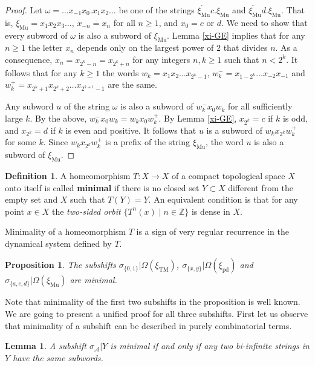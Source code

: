 \documentclass[12pt]{article}
\newtheorem{lemma}[theorem]{Lemma}
\newtheorem{proposition}[theorem]{Proposition}
\theoremstyle{definition}
\newtheorem{definition}[theorem]{Definition}
\def\bZ{\mathbb{Z}}
\def\cA{\mathcal{A}}
\def\om{\omega}
\def\si{\sigma}
\def\Om{\Omega}
\def\xiTM{\xi_{\mathrm{TM}}}
\def\xipd{\xi_{\mathrm{pd}}}
\def\xiGE{\xi_{\mathrm{Mu}}}
\begin{document}
\begin{proof}
Let $\om=\ldots x_{-1}x_0.x_1x_2\ldots$ be one of the strings 
$\overleftarrow{\xiGE}c.\xiGE$ and $\overleftarrow{\xiGE}d.\xiGE$.  That 
is, $\xiGE=x_1x_2x_3\ldots$, $x_{-n}=x_n$ for all $n\ge1$, and $x_0=c$ or 
$d$.  We need to show that every subword of $\om$ is also a subword of 
$\xiGE$.  Lemma \ref{xi-GE} implies that for any $n\ge1$ the letter 
$x_n$ depends only on the largest power of $2$ that divides $n$.  As a 
consequence, $x_n=x_{2^k-n}=x_{2^k+n}$ for any integers $n,k\ge1$ such that 
$n<2^k$.  It follows that for any $k\ge1$ the words $w_k=x_1x_2\ldots 
x_{2^k-1}$, $w^-_k=x_{1-2^k}\ldots x_{-2}x_{-1}$ and 
$w^+_k=x_{2^k+1}x_{2^k+2}\ldots x_{2^{k+1}-1}$ are the same.

Any subword $u$ of the string $\om$ is also a subword of $w^-_kx_0w_k$ for 
all sufficiently large $k$.  By the above, $w^-_kx_0w_k=w_kx_0w^+_k$.  By 
Lemma \ref{xi-GE}, $x_{2^k}=c$ if $k$ is odd, and $x_{2^k}=d$ if $k$ is 
even and positive.  It follows that $u$ is a subword of $w_kx_{2^k}w^+_k$ 
for some $k$.  Since $w_kx_{2^k}w^+_k$ is a prefix of the string $\xiGE$, 
the word $u$ is also a subword of $\xiGE$.
\end{proof}

\begin{definition}\label{def-minimal}
A homeomorphism $T:X\to X$ of a compact topological space $X$ onto itself 
is called \textbf{minimal} if there is no closed set $Y\subset X$ different 
from the empty set and $X$ such that $T(Y)=Y$.  An equivalent condition is 
that for any point $x\in X$ the \emph{two-sided orbit} $\{T^n(x)\mid 
n\in\bZ\}$ is dense in $X$.
\end{definition}

Minimality of a homeomorphism $T$ is a sign of very regular recurrence in 
the dynamical system defined by $T$.

\begin{proposition}\label{3-subshifts-minimal}
The subshifts $\si_{\{0,1\}}|\Om(\xiTM)$, $\si_{\{x,y\}}|\Om(\xipd)$ and 
$\si_{\{a,c,d\}}|\Om(\xiGE)$ are minimal.
\end{proposition}

Note that minimality of the first two subshifts in the proposition is well 
known.  We are going to present a unified proof for all three subshifts.
First let us observe that minimality of a subshift can be described in 
purely combinatorial terms.

\begin{lemma}\label{same-subwords}
A subshift $\si_{\cA}|Y$ is minimal if and only if any two bi-infinite 
strings in $Y$ have the same subwords.
\end{lemma}
\end{document}
